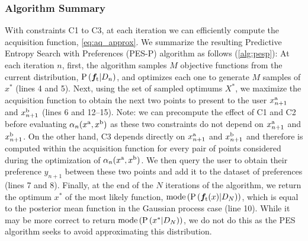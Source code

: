 \subsubsection{Algorithm Summary}
With constraints C1 to C3, at each iteration we can efficiently compute the
acquisition function, \cref{eq:aq_approx}. We summarize the resulting Predictive
Entropy Search with Preferences (PES-P) algorithm as follows (\cref{alg:pesp}):
At each iteration $n$, first, the algorithm samples $M$ objective functions from
the current distribution, $\prob{\vecf{f}[\tn{t}]|D_n}$, and optimizes each one
to generate $M$ samples of $x^*$ (lines 4 and 5).  Next, using the set of
sampled optimums $X^*$, we maximize the acquisition function to obtain the next
two points to present to the user $x_{n+1}^{\mathrm{a}}$ and $x_{n+1}^{\mathrm{b}}$ (lines 6
and 12--15). Note: we can precompute the effect of C1 and C2 before evaluating
$\funcil{\alpha}[n]{x^\tn{a}, x^\tn{b}}$ as these two constraints do not depend
on $x_{n+1}^{\mathrm{a}}$ and $x_{n+1}^{\mathrm{b}}$. On the other hand, C3 depends directly
on $x_{n+1}^{\mathrm{a}}$ and $x_{n+1}^{\mathrm{b}}$ and therefore is computed within the
acquisition function for every pair of points considered during the optimization
of $\funcil{\alpha}[n]{x^\tn{a}, x^\tn{b}}$. We then query the user to obtain
their preference $y_{n+1}$ between these two points and add it to the dataset of
preferences (lines 7 and 8). Finally, at the end of the $N$ iterations of the
algorithm, we return the optimum $x^*$ of the most likely function,
$\func{mode}{\prob{\vecf{f}[\tn{t}](x)| D_N}}$, which is equal to the posterior
mean function in the Gaussian process case (line 10). While it may be more
correct to return $\func{mode}{\prob{x^*|D_N}}$, we do not do this as the PES
algorithm seeks to avoid approximating this distribution.
